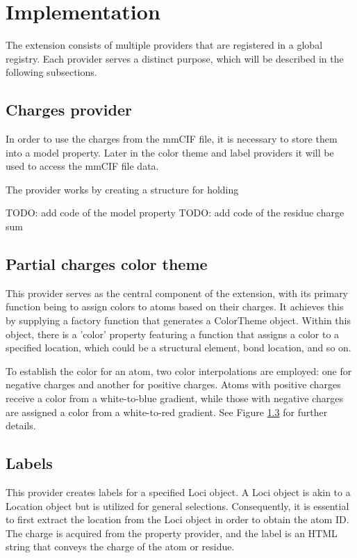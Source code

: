 \documentclass[
  digital,     %
  oneside,     %
  nosansbold,  %
  nocolorbold, %
  lof,         %
  lot,         %
]{fithesis4}
\begin{document}
\section{Implementation}

The extension consists of multiple providers that are registered in a global registry. Each provider serves a distinct purpose, which will be described in the following subsections.

\subsection{Charges provider}

In order to use the charges from the mmCIF file, it is necessary to store them into a model property. Later in the color theme and label providers it will be used to access the mmCIF file data.

The provider works by creating a structure for holding 

TODO: add code of the model property
TODO: add code of the residue charge sum

\subsection{Partial charges color theme}

This provider serves as the central component of the extension, with its primary function being to assign colors to atoms based on their charges. It achieves this by supplying a factory function that generates a ColorTheme object. Within this object, there is a 'color' property featuring a function that assigns a color to a specified location, which could be a structural element, bond location, and so on.

To establish the color for an atom, two color interpolations are employed: one for negative charges and another for positive charges. Atoms with positive charges receive a color from a white-to-blue gradient, while those with negative charges are assigned a color from a white-to-red gradient. See Figure \ref{} for further details.

\subsection{Labels}

This provider creates labels for a specified Loci object. A Loci object is akin to a Location object but is utilized for general selections. Consequently, it is essential to first extract the location from the Loci object in order to obtain the atom ID. The charge is acquired from the property provider, and the label is an HTML string that conveys the charge of the atom or residue.
\end{document}
